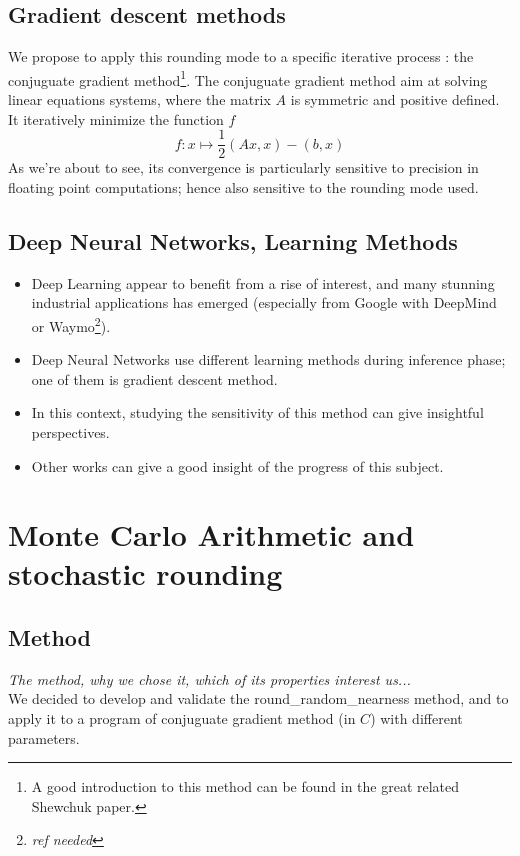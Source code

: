 \documentclass[a4paper,11pt]{article}
\let\cite=\supercite
\begin{document}
\subsection{Gradient descent methods}
	We propose to apply this rounding mode to a specific iterative process : the conjuguate gradient method\footnote{A good introduction to this method can be found in the great related Shewchuk paper\cite{shewchuk1994introduction}.}. 
  The conjuguate gradient method aim at solving linear equations systems, where the matrix $A$ is symmetric and positive defined. It iteratively minimize the function $f$
  \[ f : x \mapsto \frac{1}{2}\left(Ax,x\right)-\left(b,x\right) \] %
  As we're about to see, its convergence is particularly sensitive to precision in floating point computations; hence also sensitive to the rounding mode used. %

\subsection{Deep Neural Networks, Learning Methods}
\begin{itemize}
   \item Deep Learning appear to benefit from a rise of interest, and many stunning industrial applications has emerged (especially from Google with DeepMind or Waymo\footnote{\emph{ref needed}}).
   \item Deep Neural Networks use different learning methods during inference phase; one of them is gradient descent method.
   \item In this context, studying the sensitivity of this method can give insightful perspectives. %
   \item Other works can give a good insight of the progress of this subject\cite{Gupta2015}\cite{Courbariaux2014}.
 \end{itemize} 


\section{Monte Carlo Arithmetic and stochastic rounding} %
\subsection{Method}
\emph{The method, why we chose it, which of its properties interest us...}
\\We decided to develop and validate the {\ttfamily round\_random\_nearness} method, and to apply it to a program of conjuguate gradient method (in $C$) with different parameters. %
\end{document}

